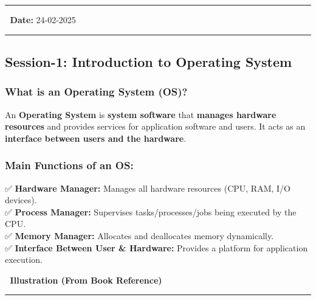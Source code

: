 \documentclass[
]{article}
\author{}
\date{}
\makeatletter
\newcommand*\pandocbounded[1]{%
  \sbox\pandoc@box{#1}%
  \Gscale@div\@tempa{\textheight}{\dimexpr\ht\pandoc@box+\dp\pandoc@box\relax}%
  \Gscale@div\@tempb{\linewidth}{\wd\pandoc@box}%
  \ifdim\@tempb\p@<\@tempa\p@\let\@tempa\@tempb\fi%
  \ifdim\@tempa\p@<\p@\scalebox{\@tempa}{\usebox\pandoc@box}%
  \else\usebox{\pandoc@box}%
  \fi%
}
\makeatother
\begin{document}
\begin{center}\rule{0.5\linewidth}{0.5pt}\end{center}

📅 \textbf{Date:} 24-02-2025

\begin{center}\rule{0.5\linewidth}{0.5pt}\end{center}

\subsection{\texorpdfstring{\textbf{Session-1: Introduction to Operating
System}}{Session-1: Introduction to Operating System}}\label{session-1-introduction-to-operating-system}

\subsubsection{\texorpdfstring{\textbf{What is an Operating System
(OS)?}}{What is an Operating System (OS)?}}\label{what-is-an-operating-system-os}

An \textbf{Operating System} is \textbf{system software} that
\textbf{manages hardware resources} and provides services for
application software and users. It acts as an \textbf{interface between
users and the hardware}.

\subsubsection{\texorpdfstring{\textbf{Main Functions of an
OS:}}{Main Functions of an OS:}}\label{main-functions-of-an-os}

✅ \textbf{Hardware Manager:} Manages all hardware resources (CPU, RAM,
I/O devices).\\
✅ \textbf{Process Manager:} Supervises tasks/processes/jobs being
executed by the CPU.\\
✅ \textbf{Memory Manager:} Allocates and deallocates memory
dynamically.\\
✅ \textbf{Interface Between User \& Hardware:} Provides a platform for
application execution.

📌 \textbf{Illustration (From Book Reference)}\\
\pandocbounded{\texttt{[image: Day\_1\_1.jpeg]}}

\begin{center}\rule{0.5\linewidth}{0.5pt}\end{center}
\end{document}
